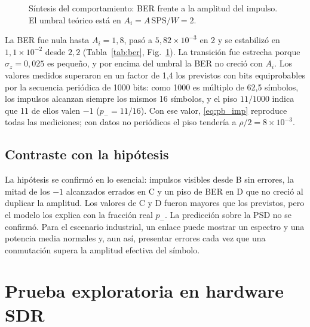 \begin{figure}[!t]
\caption{Síntesis del comportamiento: BER frente a la amplitud del impulso. El
umbral teórico está en $A_i=A\,\mathrm{SPS}/W=2$.}
\label{fig:ber}
\end{figure}

La BER fue nula hasta $A_i=1{,}8$, pasó a $5{,}82\times10^{-3}$ en 2 y se
estabilizó en $1{,}1\times10^{-2}$ desde $2{,}2$ (Tabla~\ref{tab:ber},
Fig.~\ref{fig:ber}). La transición fue estrecha porque $\sigma_z=0{,}025$ es
pequeño, y por encima del umbral la BER no creció con $A_i$. Los valores
medidos superaron en un factor de 1,4 los previstos con bits equiprobables por
la secuencia periódica de 1000 bits: como 1000 es múltiplo de 62,5 símbolos,
los impulsos alcanzan siempre los mismos 16 símbolos, y el piso
$11/1000$ indica que 11 de ellos valen $-1$ ($p_-=11/16$). Con ese valor,
\eqref{eq:pb_imp} reproduce todas las mediciones; con datos no periódicos el
piso tendería a $\rho/2=8\times10^{-3}$.

\subsection{Contraste con la hipótesis}\label{subsec:contraste}

La hipótesis se confirmó en lo esencial: impulsos visibles desde B sin errores,
la mitad de los $-1$ alcanzados errados en C y un piso de BER en D que no creció
al duplicar la amplitud. Los valores de C y D fueron mayores que los previstos,
pero el modelo los explica con la fracción real $p_-$. La predicción sobre la
PSD no se confirmó. Para el escenario industrial, un enlace puede mostrar un
espectro y una potencia media normales y, aun así, presentar errores cada vez
que una conmutación supera la amplitud efectiva del símbolo.

\section{Prueba exploratoria en hardware SDR}\label{sec:hardware}


